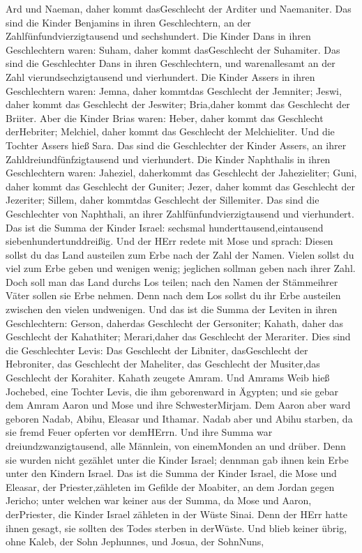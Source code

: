 Ard und Naeman, daher kommt dasGeschlecht der Arditer und Naemaniter.
 Das sind die Kinder Benjamins in ihren Geschlechtern, an
der Zahlfünfundvierzigtausend und sechshundert.  Die Kinder
Dans in ihren Geschlechtern waren: Suham, daher kommt dasGeschlecht der
Suhamiter.  Das sind die Geschlechter Dans in ihren
Geschlechtern, und warenallesamt an der Zahl vierundsechzigtausend und
vierhundert.  Die Kinder Assers in ihren Geschlechtern
waren: Jemna, daher kommtdas Geschlecht der Jemniter; Jeswi, daher kommt
das Geschlecht der Jeswiter; Bria,daher kommt das Geschlecht der
Briiter.  Aber die Kinder Brias waren: Heber, daher kommt
das Geschlecht derHebriter; Melchiel, daher kommt das Geschlecht der
Melchieliter.  Und die Tochter Assers hieß Sara.
 Das sind die Geschlechter der Kinder Assers, an ihrer
Zahldreiundfünfzigtausend und vierhundert.  Die Kinder
Naphthalis in ihren Geschlechtern waren: Jaheziel, daherkommt das
Geschlecht der Jahezieliter; Guni, daher kommt das Geschlecht der
Guniter;  Jezer, daher kommt das Geschlecht der Jezeriter;
Sillem, daher kommtdas Geschlecht der Sillemiter.  Das sind
die Geschlechter von Naphthali, an ihrer Zahlfünfundvierzigtausend und
vierhundert.  Das ist die Summa der Kinder Israel: sechsmal
hunderttausend,eintausend siebenhundertunddreißig.  Und der
HErr redete mit Mose und sprach:  Diesen sollst du das Land
austeilen zum Erbe nach der Zahl der Namen.  Vielen sollst
du viel zum Erbe geben und wenigen wenig; jeglichen sollman geben nach
ihrer Zahl.  Doch soll man das Land durchs Los teilen; nach
den Namen der Stämmeihrer Väter sollen sie Erbe nehmen. 
Denn nach dem Los sollst du ihr Erbe austeilen zwischen den vielen
undwenigen.  Und das ist die Summa der Leviten in ihren
Geschlechtern: Gerson, daherdas Geschlecht der Gersoniter; Kahath, daher
das Geschlecht der Kahathiter; Merari,daher das Geschlecht der
Merariter.  Dies sind die Geschlechter Levis: Das
Geschlecht der Libniter, dasGeschlecht der Hebroniter, das Geschlecht
der Maheliter, das Geschlecht der Musiter,das Geschlecht der Korahiter.
Kahath zeugete Amram.  Und Amrams Weib hieß Jochebed, eine
Tochter Levis, die ihm geborenward in Ägypten; und sie gebar dem Amram
Aaron und Mose und ihre SchwesterMirjam.  Dem Aaron aber
ward geboren Nadab, Abihu, Eleasar und Ithamar.  Nadab aber
und Abihu starben, da sie fremd Feuer opferten vor demHErrn.
 Und ihre Summa war dreiundzwanzigtausend, alle Männlein,
von einemMonden an und drüber. Denn sie wurden nicht gezählet unter die
Kinder Israel; dennman gab ihnen kein Erbe unter den Kindern Israel.
 Das ist die Summa der Kinder Israel, die Mose und Eleasar,
der Priester,zähleten im Gefilde der Moabiter, an dem Jordan gegen
Jericho;  unter welchen war keiner aus der Summa, da Mose
und Aaron, derPriester, die Kinder Israel zähleten in der Wüste Sinai.
 Denn der HErr hatte ihnen gesagt, sie sollten des Todes
sterben in derWüste. Und blieb keiner übrig, ohne Kaleb, der Sohn
Jephunnes, und Josua, der SohnNuns,

